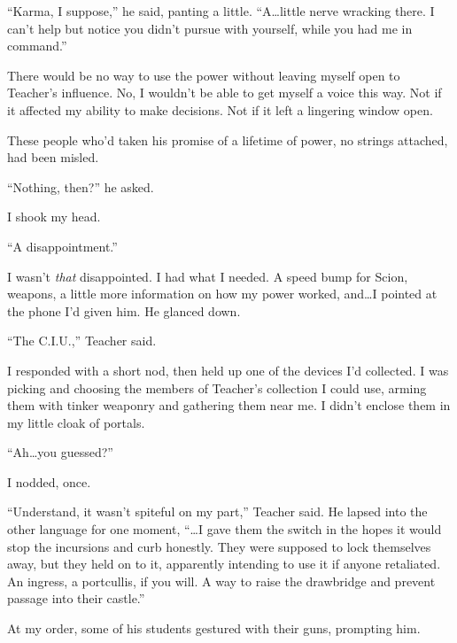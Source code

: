 ``Karma, I suppose,'' he said, panting a little.  ``A\ldots little nerve wracking there.  I can't help but notice you didn't pursue with yourself, while you had me in command.''



There would be no way to use the power without leaving myself open to Teacher's influence.  No, I wouldn't be able to get myself a voice this way.  Not if it affected my ability to make decisions.  Not if it left a lingering window open.



These people who'd taken his promise of a lifetime of power, no strings attached, had been misled.



``Nothing, then?'' he asked.



I shook my head.



``A disappointment.''



I wasn't \emph{that} disappointed.  I had what I needed.  A speed bump for Scion, weapons, a little more information on how my power worked, and\ldots  I pointed at the phone I'd given him.  He glanced down.



``The C.I.U.,'' Teacher said.



I responded with a short nod, then held up one of the devices I'd collected.  I was picking and choosing the members of Teacher's collection I could use, arming them with tinker weaponry and gathering them near me.  I didn't enclose them in my little cloak of portals.



``Ah\ldots you guessed?''



I nodded, once.



``Understand, it wasn't spiteful on my part,'' Teacher said.  He lapsed into the other language for one moment, ``\ldots{}I gave them the switch in the hopes it would stop the incursions and curb honestly.  They were supposed to lock themselves away, but they held on to it, apparently intending to use it if anyone retaliated.  An ingress, a portcullis, if you will.  A way to raise the drawbridge and prevent passage into their castle.''



At my order, some of his students gestured with their guns, prompting him.



